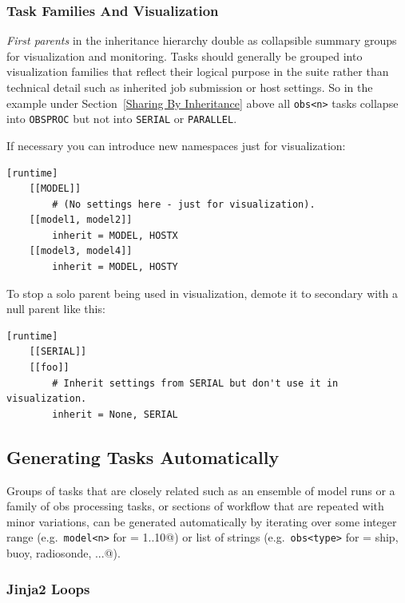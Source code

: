 \subsubsection{Task Families And Visualization}
\label{Task Families And Visualization}

{\em First parents} in the inheritance hierarchy double as collapsible summary
groups for visualization and monitoring. Tasks should generally be grouped into
visualization families that reflect their logical purpose in the suite rather
than technical detail such as inherited job submission or host settings. So in
the example under Section~\ref{Sharing By Inheritance} above all
\lstinline=obs<n>= tasks collapse into \lstinline=OBSPROC= but not into
\lstinline=SERIAL= or \lstinline=PARALLEL=.

If necessary you can introduce new namespaces just for visualization:

\lstset{language=suiterc}
\begin{lstlisting}
[runtime]
    [[MODEL]]
        # (No settings here - just for visualization).
    [[model1, model2]]
        inherit = MODEL, HOSTX
    [[model3, model4]]
        inherit = MODEL, HOSTY
\end{lstlisting}

To stop a solo parent being used in visualization, demote it to secondary with
a null parent like this:

\lstset{language=suiterc}
\begin{lstlisting}
[runtime]
    [[SERIAL]]
    [[foo]]
        # Inherit settings from SERIAL but don't use it in visualization.
        inherit = None, SERIAL
\end{lstlisting}

\subsection{Generating Tasks Automatically}
\label{Generating Tasks}

Groups of tasks that are closely related such as an ensemble of model runs or 
a family of obs processing tasks, or sections of workflow that are repeated
with minor variations, can be generated automatically by iterating over
some integer range (e.g.\ \lstinline=model<n>= for \lstinline@n = 1..10@) or
list of strings (e.g.\ \lstinline=obs<type>= for
\lstinline@type = ship, buoy, radiosonde, ...@).

\subsubsection{Jinja2 Loops}

